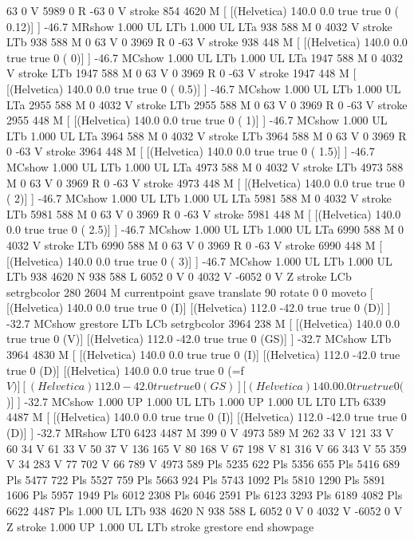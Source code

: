 63 0 V
5989 0 R
-63 0 V
stroke
854 4620 M
[ [(Helvetica) 140.0 0.0 true true 0 ( 0.12)]
] -46.7 MRshow
1.000 UL
LTb
1.000 UL
LTa
938 588 M
0 4032 V
stroke
LTb
938 588 M
0 63 V
0 3969 R
0 -63 V
stroke
938 448 M
[ [(Helvetica) 140.0 0.0 true true 0 ( 0)]
] -46.7 MCshow
1.000 UL
LTb
1.000 UL
LTa
1947 588 M
0 4032 V
stroke
LTb
1947 588 M
0 63 V
0 3969 R
0 -63 V
stroke
1947 448 M
[ [(Helvetica) 140.0 0.0 true true 0 ( 0.5)]
] -46.7 MCshow
1.000 UL
LTb
1.000 UL
LTa
2955 588 M
0 4032 V
stroke
LTb
2955 588 M
0 63 V
0 3969 R
0 -63 V
stroke
2955 448 M
[ [(Helvetica) 140.0 0.0 true true 0 ( 1)]
] -46.7 MCshow
1.000 UL
LTb
1.000 UL
LTa
3964 588 M
0 4032 V
stroke
LTb
3964 588 M
0 63 V
0 3969 R
0 -63 V
stroke
3964 448 M
[ [(Helvetica) 140.0 0.0 true true 0 ( 1.5)]
] -46.7 MCshow
1.000 UL
LTb
1.000 UL
LTa
4973 588 M
0 4032 V
stroke
LTb
4973 588 M
0 63 V
0 3969 R
0 -63 V
stroke
4973 448 M
[ [(Helvetica) 140.0 0.0 true true 0 ( 2)]
] -46.7 MCshow
1.000 UL
LTb
1.000 UL
LTa
5981 588 M
0 4032 V
stroke
LTb
5981 588 M
0 63 V
0 3969 R
0 -63 V
stroke
5981 448 M
[ [(Helvetica) 140.0 0.0 true true 0 ( 2.5)]
] -46.7 MCshow
1.000 UL
LTb
1.000 UL
LTa
6990 588 M
0 4032 V
stroke
LTb
6990 588 M
0 63 V
0 3969 R
0 -63 V
stroke
6990 448 M
[ [(Helvetica) 140.0 0.0 true true 0 ( 3)]
] -46.7 MCshow
1.000 UL
LTb
1.000 UL
LTb
938 4620 N
938 588 L
6052 0 V
0 4032 V
-6052 0 V
Z stroke
LCb setrgbcolor
280 2604 M
currentpoint gsave translate 90 rotate 0 0 moveto
[ [(Helvetica) 140.0 0.0 true true 0 (I)]
[(Helvetica) 112.0 -42.0 true true 0 (D)]
] -32.7 MCshow
grestore
LTb
LCb setrgbcolor
3964 238 M
[ [(Helvetica) 140.0 0.0 true true 0 (V)]
[(Helvetica) 112.0 -42.0 true true 0 (GS)]
] -32.7 MCshow
LTb
3964 4830 M
[ [(Helvetica) 140.0 0.0 true true 0 (I)]
[(Helvetica) 112.0 -42.0 true true 0 (D)]
[(Helvetica) 140.0 0.0 true true 0 (=f\(V)]
[(Helvetica) 112.0 -42.0 true true 0 (GS)]
[(Helvetica) 140.0 0.0 true true 0 (\))]
] -32.7 MCshow
1.000 UP
1.000 UL
LTb
1.000 UP
1.000 UL
LT0
LTb
6339 4487 M
[ [(Helvetica) 140.0 0.0 true true 0 (I)]
[(Helvetica) 112.0 -42.0 true true 0 (D)]
] -32.7 MRshow
LT0
6423 4487 M
399 0 V
4973 589 M
262 33 V
121 33 V
60 34 V
61 33 V
50 37 V
136 165 V
80 168 V
67 198 V
81 316 V
66 343 V
55 359 V
34 283 V
77 702 V
66 789 V
4973 589 Pls
5235 622 Pls
5356 655 Pls
5416 689 Pls
5477 722 Pls
5527 759 Pls
5663 924 Pls
5743 1092 Pls
5810 1290 Pls
5891 1606 Pls
5957 1949 Pls
6012 2308 Pls
6046 2591 Pls
6123 3293 Pls
6189 4082 Pls
6622 4487 Pls
1.000 UL
LTb
938 4620 N
938 588 L
6052 0 V
0 4032 V
-6052 0 V
Z stroke
1.000 UP
1.000 UL
LTb
stroke
grestore
end
showpage
